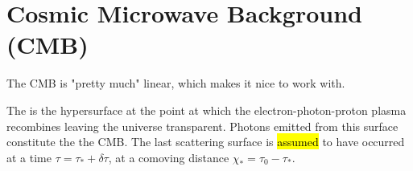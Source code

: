 \documentclass{article}
\begin{document}
\section{Cosmic Microwave Background (CMB)}
\begin{idea}
The CMB is "pretty much" linear, which makes it nice to work with. 
\end{idea}

\begin{definition}
The  is the hypersurface at the point at which the electron-photon-proton plasma recombines leaving the universe transparent. Photons emitted from this surface constitute the the CMB. The last scattering surface is \hl{assumed} to have occurred at a time $\tau = \tau_\ast + \delta \tau$, at a comoving distance $\chi_\ast = \tau_0 - \tau_\ast$. 
\end{definition}


\end{document}

